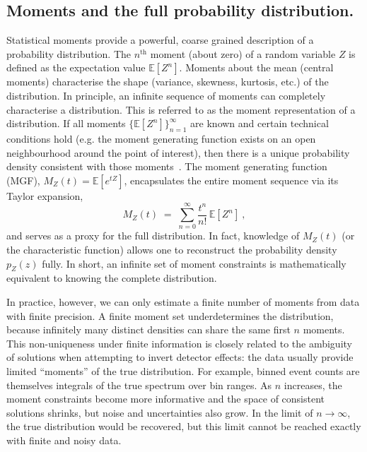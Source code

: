 {{    \subsection{Moments and the full probability distribution.}
        Statistical moments provide a powerful, coarse grained description of a probability distribution.
        The $n^\text{th}$ moment (about zero) of a random variable $Z$ is defined as the expectation value $\mathbb{E}[Z^n]$.
        Moments about the mean (central moments) characterise the shape (variance, skewness, kurtosis, etc.) of the distribution.
        In principle, an infinite sequence of moments can completely characterise a distribution.
        This is referred to as the moment representation of a distribution.
        If all moments $\{\mathbb{E}[Z^n]\}_{n=1}^\infty$ are known and certain technical conditions hold (e.g. the moment generating function exists on an open neighbourhood around the point of interest), then there is a unique probability density consistent with those moments~\cite{alma9914845810606531,Hausdorff1921,hornik_multilayer_1989,weierstras_uber_1885,taylor_methodus_1715}.
        The moment generating function (MGF), $M_Z(t) = \mathbb{E}[e^{tZ}]$, encapsulates the entire moment sequence via its Taylor expansion,
        \[
            M_Z(t) \;=\; \sum_{n=0}^\infty \frac{t^n}{n!}\,\mathbb{E}[Z^n]~,
        \]
        and serves as a proxy for the full distribution.
        In fact, knowledge of $M_Z(t)$ (or the characteristic function) allows one to reconstruct the probability density $p_Z(z)$ fully.
        In short, an infinite set of moment constraints is mathematically equivalent to knowing the complete distribution.

        In practice, however, we can only estimate a finite number of moments from data with finite precision.
        A finite moment set underdetermines the distribution, because infinitely many distinct densities can share the same first $n$ moments.
        This non-uniqueness under finite information is closely related to the ambiguity of solutions when attempting to invert detector effects: the data usually provide limited ``moments'' of the true distribution.
        For example, binned event counts are themselves integrals of the true spectrum over bin ranges.
        As $n$ increases, the moment constraints become more informative and the space of consistent solutions shrinks, but noise and uncertainties also grow.
        In the limit of $n\to\infty$, the true distribution would be recovered, but this limit cannot be reached exactly with finite and noisy data.

}}
